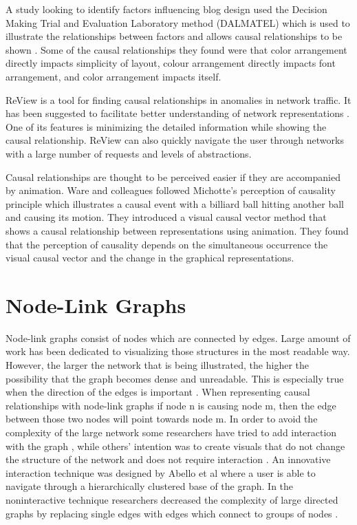 \documentclass{l4proj}
\begin{document}
A study looking to identify factors influencing blog design used the Decision Making Trial and Evaluation Laboratory method (DALMATEL) which is used to illustrate the relationships between factors and allows causal relationships to be shown \cite{hsu2012evaluation}. Some of the causal relationships they found were that color arrangement directly impacts simplicity of layout, colour arrangement directly impacts font arrangement, and color arrangement impacts itself. 

ReView is a tool for finding causal relationships in anomalies in network traffic. It has been suggested to facilitate better understanding of network representations \cite{Zhang:2015:VTC:2713579.2713583}. One of its features is minimizing the detailed information while showing the causal relationship. ReView can also quickly navigate the user through networks with a large number of requests and levels of abstractions.

Causal relationships are thought to be perceived easier if they are accompanied by animation. Ware and colleagues \cite{ware1999visualizing} followed Michotte's perception of causality principle which illustrates a causal event with a billiard ball hitting another ball and causing its motion. They introduced a visual causal vector method that shows a causal relationship between representations using animation. They found that the perception of causality depends on the simultaneous occurrence the visual causal vector and the change in the graphical representations. 

\section{Node-Link Graphs}

Node-link graphs consist of nodes which are connected by edges. Large amount of work has been dedicated to visualizing those structures in the most readable way. However, the larger the network that is being illustrated, the higher the possibility that the graph becomes dense and unreadable. This is especially true when the direction of the edges is important \cite{dwyer2013edge}. When representing causal relationships with node-link graphs if node n is causing node m, then the edge between those two nodes will point towards node m. In order to avoid the complexity of the large network some researchers have tried to add interaction with the graph \cite{gansner2005topological}, while others' intention was to create visuals that do not change the structure of the network and does not require interaction \cite{dwyer2013edge}. An innovative interaction technique was designed by Abello et al \cite{abello2006ask} where a user is able to navigate through a hierarchically clustered base of the graph. In the noninteractive technique researchers decreased the complexity of large directed graphs by replacing single edges with edges which connect to groups of nodes \cite{dwyer2013edge}.  
\end{document}

